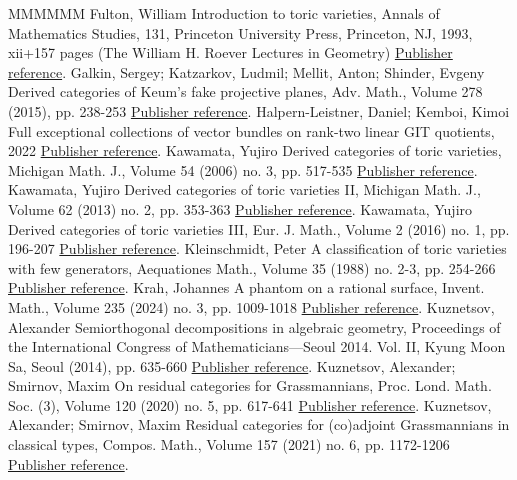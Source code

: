 \begin{thebibliography}{MMMMMM}
 Fulton, William Introduction to toric varieties, Annals of Mathematics Studies, 131, Princeton University Press, Princeton, NJ, 1993, xii+157 pages (The William H. Roever Lectures in Geometry) \href{https://alco.centre-mersenne.org/articles/10.5802/alco.371/#fultonToric}{Publisher reference}.
 Galkin, Sergey; Katzarkov, Ludmil; Mellit, Anton; Shinder, Evgeny Derived categories of Keum’s fake projective planes, Adv. Math., Volume 278 (2015), pp. 238-253 \href{https://alco.centre-mersenne.org/articles/10.5802/alco.371/#phantomsGalkin1}{Publisher reference}.
 Halpern-Leistner, Daniel; Kemboi, Kimoi Full exceptional collections of vector bundles on rank-two linear GIT quotients, 2022 \href{https://alco.centre-mersenne.org/articles/10.5802/alco.371/#DHLKK}{Publisher reference}.
 Kawamata, Yujiro Derived categories of toric varieties, Michigan Math. J., Volume 54 (2006) no. 3, pp. 517-535 \href{https://alco.centre-mersenne.org/articles/10.5802/alco.371/#kaw1}{Publisher reference}.
 Kawamata, Yujiro Derived categories of toric varieties II, Michigan Math. J., Volume 62 (2013) no. 2, pp. 353-363 \href{https://alco.centre-mersenne.org/articles/10.5802/alco.371/#kaw2}{Publisher reference}.
 Kawamata, Yujiro Derived categories of toric varieties III, Eur. J. Math., Volume 2 (2016) no. 1, pp. 196-207 \href{https://alco.centre-mersenne.org/articles/10.5802/alco.371/#kaw3}{Publisher reference}.
 Kleinschmidt, Peter A classification of toric varieties with few generators, Aequationes Math., Volume 35 (1988) no. 2-3, pp. 254-266 \href{https://alco.centre-mersenne.org/articles/10.5802/alco.371/#kle88}{Publisher reference}.
 Krah, Johannes A phantom on a rational surface, Invent. Math., Volume 235 (2024) no. 3, pp. 1009-1018 \href{https://alco.centre-mersenne.org/articles/10.5802/alco.371/#krah}{Publisher reference}.
 Kuznetsov, Alexander Semiorthogonal decompositions in algebraic geometry, Proceedings of the International Congress of Mathematicians—Seoul 2014. Vol. II, Kyung Moon Sa, Seoul (2014), pp. 635-660 \href{https://alco.centre-mersenne.org/articles/10.5802/alco.371/#KuznetsovICM}{Publisher reference}.
 Kuznetsov, Alexander; Smirnov, Maxim On residual categories for Grassmannians, Proc. Lond. Math. Soc. (3), Volume 120 (2020) no. 5, pp. 617-641 \href{https://alco.centre-mersenne.org/articles/10.5802/alco.371/#resCatLMS}{Publisher reference}.
 Kuznetsov, Alexander; Smirnov, Maxim Residual categories for (co)adjoint Grassmannians in classical types, Compos. Math., Volume 157 (2021) no. 6, pp. 1172-1206 \href{https://alco.centre-mersenne.org/articles/10.5802/alco.371/#resCatCompositio}{Publisher reference}.

\end{thebibliography}
